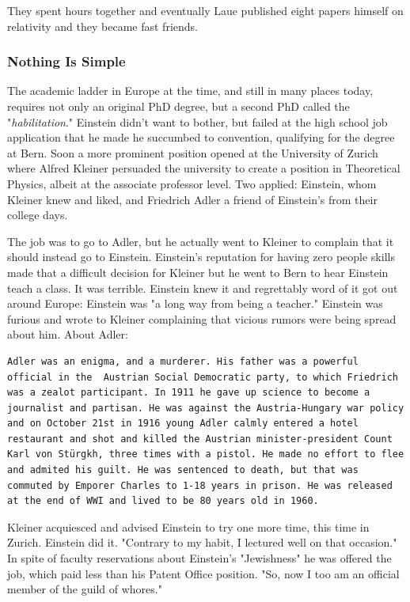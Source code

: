 \documentclass[
]{article}
\begin{document}
They spent hours together and eventually Laue published eight papers
himself on relativity and they became fast friends.

\hypertarget{nothing-is-simple}{%
\subsubsection{Nothing Is Simple}\label{nothing-is-simple}}

The academic ladder in Europe at the time, and still in many places
today, requires not only an original PhD degree, but a second PhD called
the "\emph{habilitation}." Einstein didn't want to bother, but failed at
the high school job application that he made he succumbed to convention,
qualifying for the degree at Bern. Soon a more prominent position opened
at the University of Zurich where Alfred Kleiner persuaded the
university to create a position in Theoretical Physics, albeit at the
associate professor level. Two applied: Einstein, whom Kleiner knew and
liked, and Friedrich Adler a friend of Einstein's from their college
days.

The job was to go to Adler, but he actually went to Kleiner to complain
that it should instead go to Einstein. Einstein's reputation for having
zero people skills made that a difficult decision for Kleiner but he
went to Bern to hear Einstein teach a class. It was terrible. Einstein
knew it and regrettably word of it got out around Europe: Einstein was
"a long way from being a teacher." Einstein was furious and wrote to
Kleiner complaining that vicious rumors were being spread about him.
About Adler:

\begin{verbatim}
Adler was an enigma, and a murderer. His father was a powerful official in the  Austrian Social Democratic party, to which Friedrich was a zealot participant. In 1911 he gave up science to become a journalist and partisan. He was against the Austria-Hungary war policy and on October 21st in 1916 young Adler calmly entered a hotel restaurant and shot and killed the Austrian minister-president Count Karl von Stürgkh, three times with a pistol. He made no effort to flee and admited his guilt. He was sentenced to death, but that was commuted by Emporer Charles to 1-18 years in prison. He was released at the end of WWI and lived to be 80 years old in 1960.
\end{verbatim}

Kleiner acquiesced and advised Einstein to try one more time, this time
in Zurich. Einstein did it. "Contrary to my habit, I lectured well on
that occasion." In spite of faculty reservations about Einstein's
"Jewishness" he was offered the job, which paid less than his Patent
Office position. "So, now I too am an official member of the guild of
whores."
\end{document}
